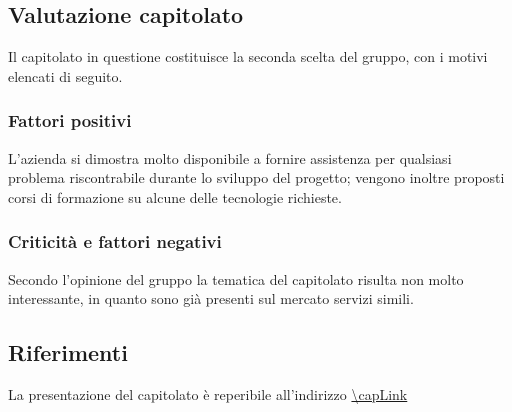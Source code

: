 \subsection{Valutazione capitolato}
Il capitolato in questione costituisce la seconda scelta del gruppo, con i motivi elencati di seguito.

\subsubsection{Fattori positivi}

L'azienda si dimostra molto disponibile a fornire assistenza per qualsiasi problema riscontrabile durante lo sviluppo del progetto; vengono inoltre proposti corsi di formazione su alcune delle tecnologie richieste.

\subsubsection{Criticità e fattori negativi}

Secondo l'opinione del gruppo la tematica del capitolato risulta non molto interessante, in quanto sono già presenti sul mercato servizi simili.

\subsection{Riferimenti}
La presentazione del capitolato è reperibile all'indirizzo \url{\capLink}